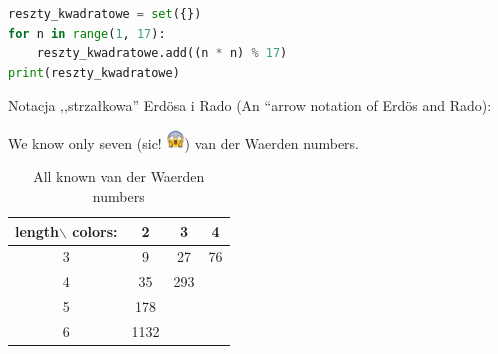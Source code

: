 \documentclass{beamer}
\begin{document}
\begin{frame}[fragile] %
  
\begin{lstlisting}[language=Python]
reszty_kwadratowe = set({})
for n in range(1, 17):
	reszty_kwadratowe.add((n * n) % 17)
print(reszty_kwadratowe)
\end{lstlisting}

\end{frame}

\begin{frame}
  \begin{block}{
    Notacja ,,strzałkowa'' Erd\"osa i Rado
    (An ``arrow notation of Erd\"os and Rado):}
  \end{block}
\end{frame}

\begin{frame}
  \begin{block}{
    We know only seven (sic! \includegraphics[height=5mm]{krzyczacy.jpeg})
    van der Waerden numbers.}
   \end{block}

\begin{table}
  \centering
  \begin{tabular}{| c | c c c |}
    \hline 
     length$\backslash$ colors: & 2 & 3 & 4 \\
    \hline
    3 & 9 & 27 & 76 \\
    \hline
    4 & 35 & 293 &  \\
    \hline
    5 & 178 &  &  \\
    \hline
    6 & 1132 & & \\
    \hline
    \end{tabular}
  \caption{All known van der Waerden numbers}
\end{table}


\end{frame}
\end{document}
